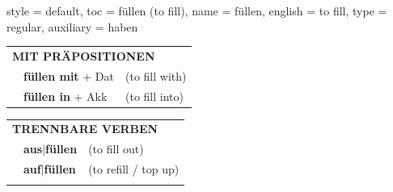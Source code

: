 \begin{verbentry}{
  style = {default},
  toc = {füllen (to fill)},
  name = {füllen},
  english = {to fill},
  type = {regular},
  auxiliary = {haben}
}
   \vspace{10pt}

   \begin{tabular}{lll}
      \multicolumn{3}{l}{\textbf{MIT PRÄPOSITIONEN}}\\
& \textbf{füllen mit} + Dat & (to fill with)\\
& \textbf{füllen in} + Akk & (to fill into)\\
\end{tabular}
  \hfill
   \begin{tabular}{lll}
      \multicolumn{3}{l}{\textbf{TRENNBARE VERBEN}}\\
 & \textbf{aus$|$füllen} & (to fill out)\\
 & \textbf{auf$|$füllen} & (to refill / top up)\\
\vspace{10pt}
  \end{tabular}

  \vspace{-5pt}
\end{verbentry}

